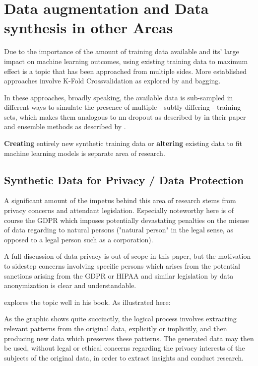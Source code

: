 \chapter{Data augmentation and Data synthesis in other Areas}
\label{chapter:synthetic_data}

Due to the importance of the amount of training data available and its' large impact on machine learning outcomes, using existing training data to maximum effect is a topic that has been approached from multiple sides. More established approaches involve K-Fold Crossvalidation as explored by \cite{kfold} and \ac{bagging}. 

In these approaches, broadly speaking, the available data is sub-sampled in different ways to simulate the presence of multiple - subtly differing - training sets, which makes them analogous to \ac{nn} dropout as described by \cite{srivastava2014dropout} in their paper and ensemble methods as described by \cite{dietterich2000ensemble}.

\textbf{Creating} entirely new synthetic training data or \textbf{altering} existing data to fit machine learning models is separate area of research. 

\pagebreak

\section{Synthetic Data for Privacy / Data Protection}

A significant amount of the impetus behind this area of research stems from privacy concerns and attendant legislation. 
Especially noteworthy here is of course the \ac{GDPR} which imposes potentially devastating penalties on the misuse of data regarding to natural persons ("natural person" in the legal sense, as opposed to a legal person such as a corporation). 

A full discussion of data privacy is out of scope in this paper, but the motivation to sidestep concerns involving specific persons which arises from the potential sanctions arising from the \ac{GDPR} or \ac{HIPAA} and similar legislation by data anonymization is clear and understandable.

\cite{el2020practical} explores the topic well in his book. As illustrated here:


As the graphic shows quite succinctly, the logical process involves extracting relevant patterns from the original data, explicitly or implicitly, and then producing new data which preserves these patterns. 
The generated data may then be used, without legal or ethical concerns regarding the privacy interests of the subjects of the original data, in order to extract insights and conduct research.

